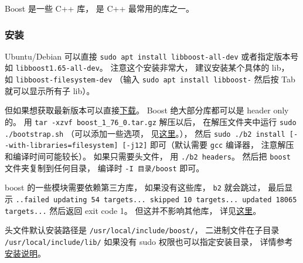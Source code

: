 

Boost 是一些 C++ 库， 是 C++ 最常用的库之一。

\subsubsection{安装}
Ubuntu/Debian 可以直接 \verb|sudo apt install libboost-all-dev| 或者指定版本号如 \verb|libboost1.65-all-dev|。 注意这个安装非常大， 建议安装某个具体的 lib， 如 \verb|libboost-filesystem-dev| （输入 \verb|sudo apt install libboost-| 然后按 Tab 就可以显示所有子 lib）。

但如果想获取最新版本可以直接\href{https://www.boost.org/users/history/version_1_76_0.html}{下载}。 Boost 绝大部分库都可以是 header only 的。 用 \verb|tar -xzvf boost_1_76_0.tar.gz| 解压以后， 在解压文件夹中运行 \verb|sudo ./bootstrap.sh| （可以添加一些选项， 见\href{https://www.boost.org/doc/libs/1_66_0/more/getting_started/unix-variants.html#easy-build-and-install}{这里}。）， 然后 \verb|sudo ./b2 install [--with-libraries=filesystem] [-j12]| 即可（默认需要 \verb|gcc| 编译器， 注意解压和编译时间可能较长）。 如果只需要头文件， 用 \verb|./b2 headers|。 然后把 \verb|boost| 文件夹复制到任何目录， 编译时 \verb|-I 目录/boost| 即可。

boost 的一些模块需要依赖第三方库， 如果没有这些库， \verb|b2| 就会跳过， 最后显示 \verb|..failed updating 54 targets... skipped 10 targets... updated 18065 targets...| 然后返回 exit code 1。 但这并不影响其他库， 详见\href{https://stackoverflow.com/questions/12906829/failed-updating-58-targets-when-trying-to-build-boost-what-happened}{这里}。

头文件默认安装路径是 \verb|/usr/local/include/boost/|， 二进制文件在子目录 \verb|/usr/local/include/lib/| 如果没有 sudo 权限也可以指定安装目录， 详情参考\href{https://www.boost.org/doc/libs/1_76_0/more/getting_started/unix-variants.html#easy-build-and-install}{安装说明}。

